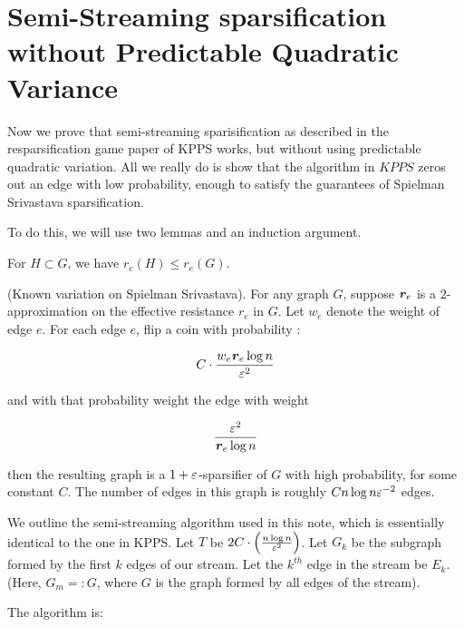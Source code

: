 \documentclass[12pt]{article}
\begin{document}
\section{Semi-Streaming sparsification without Predictable Quadratic
  Variance}

Now we prove that semi-streaming sparisification as described in the
resparsification game paper of KPPS works, but without using predictable
quadratic variation. All we really do is show that the algorithm in
$KPPS$ zeros out an edge with low probability, enough to satisfy the
guarantees of Spielman Srivastava sparsification.

To do this, we will use two lemmas and an induction argument.

\begin{lemma}
For $H \subset G$, we have $r_e(H) \leq r_e(G)$.
\end{lemma}

\begin{lemma}
(Known variation on Spielman Srivastava).
For any graph $G$, suppose $\boldsymbol{\mathit{r}}_e$ is a $2$-approximation on the
effective resistance $r_e$ in $G$. Let $w_e$ denote the weight of edge
$e$. For each edge $e$, flip a coin with probability :

\begin{align}
C \cdot \frac{w_e \boldsymbol{\mathit{r}}_e \log n}{\varepsilon^2}
\end{align}

and with that probability weight the edge with weight

\begin{align}
\frac{\varepsilon^2}{\boldsymbol{\mathit{r}}_e \log n}
\end{align}

then the resulting graph is a $1+\varepsilon$-sparsifier of $G$ with high probability,
     for some constant $C$. The number of edges in this graph is roughly
     $C n \log n \varepsilon^{-2}$ edges.
\end{lemma}

We outline the semi-streaming algorithm used in this note,  which is essentially identical
to the one in KPPS. Let $T$ be $2C \cdot \left(\frac{n \log n}{\varepsilon^2}\right)$.  
Let $G_k$ be the subgraph formed by the first $k$ edges of our stream.
Let the $k^{th}$ edge in the stream be $E_k$.
(Here, $G_m =:G$, where $G$ is the graph formed by all edges of the
 stream).

The algorithm is:
\end{document}
